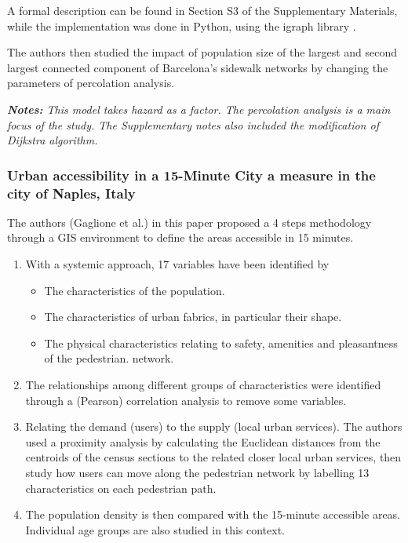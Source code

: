 A formal description can be found in Section S3 of the Supplementary Materials, while the implementation was done in Python, using the {igraph} library \cite{igraph}.

The authors then studied the impact of population size of the largest and second largest connected component of Barcelona's sidewalk networks by changing the parameters of percolation analysis.

\textit{\textbf{Notes:} This model takes hazard as a factor. The percolation analysis is a main focus of the study. The Supplementary notes also included the modification of Dijkstra algorithm.}

\subsubsection{Urban accessibility in a 15-Minute City a measure in the city of Naples, Italy \texorpdfstring{\cite{gaglione_urban_2022}}{}} \label{gaglione_urban_2022}

The authors (Gaglione et al.) in this paper proposed a 4 steps methodology through a GIS environment to define the areas accessible in 15 minutes. 

\begin{enumerate}
\item With a systemic approach, 17 variables have been identified by
\begin{itemize}
    \item The characteristics of the population.
    \item The characteristics of urban fabrics, in particular their shape.
    \item The physical characteristics relating to safety, amenities and pleasantness of the pedestrian.
    network.
\end{itemize}
\item The relationships among different groups of characteristics were identified through a (Pearson) correlation analysis to remove some variables.
\item Relating the demand (users) to the supply (local urban services). The authors used a proximity analysis by calculating the Euclidean distances from the centroids of the census sections to the related closer local urban services, then study how users can move along the pedestrian network by labelling 13 characteristics on each pedestrian path. 
\item The population density is then compared with the 15-minute accessible areas. Individual age groups are also studied in this context.
\end{enumerate}

